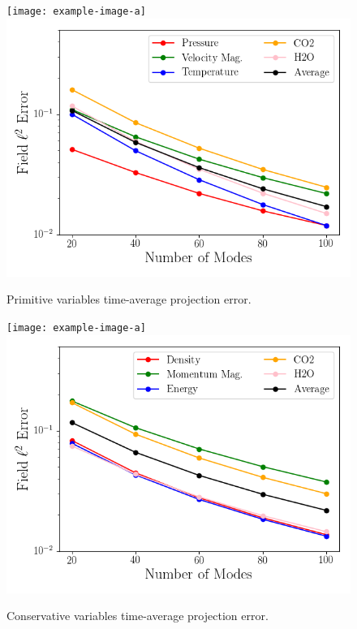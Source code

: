 \begin{figure}
	\begin{minipage}{0.48\linewidth}
		\ifdefined\DRAFT
			\texttt{[image: example-image-a]}
		\else
			\includegraphics[width=0.99\linewidth,trim={0.5em 0.5em 0.5em 0.5em},clip]{Chapters/NineElement/Images/projection_error_primitive.png}
		\fi
		\caption{\label{fig:nineElemProjErrPrim}Primitive variables time-average projection error.}
	\end{minipage} \hspace{0.5em}
	\begin{minipage}{0.48\linewidth}
		\ifdefined\DRAFT
			\texttt{[image: example-image-a]}
		\else
			\includegraphics[width=0.99\linewidth,trim={0.5em 0.5em 0.5em 0.5em},clip]{Chapters/NineElement/Images/projection_error_conservative.png}
		\fi
		\caption{\label{fig:nineElemProjErrCons}Conservative variables time-average projection error.}
	\end{minipage}
\end{figure}